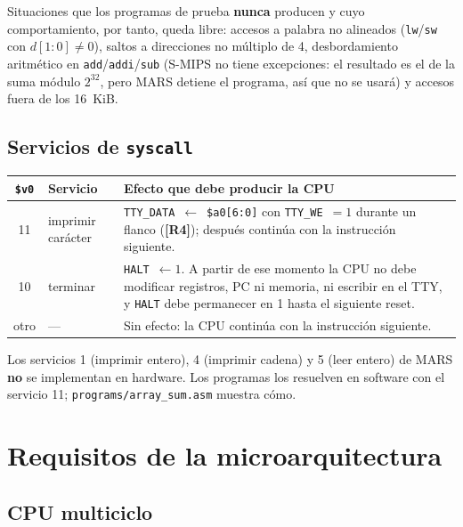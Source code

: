 \documentclass[11pt,a4paper]{article}
\newcommand{\sig}[1]{\texttt{#1}}
\newcommand{\req}[1]{\textbf{[#1]}}
\begin{document}
\noindent Situaciones que los programas de prueba \textbf{nunca} producen y cuyo comportamiento, por tanto, queda libre: accesos a palabra no alineados (\sig{lw}/\sig{sw} con $d[1{:}0]\neq 0$), saltos a direcciones no múltiplo de 4, desbordamiento aritmético en \sig{add}/\sig{addi}/\sig{sub} (S-MIPS no tiene excepciones: el resultado es el de la suma módulo $2^{32}$, pero MARS detiene el programa, así que no se usará) y accesos fuera de los 16~KiB.

\subsection{Servicios de \texttt{syscall}}\label{sec:syscall}

\begin{center}
\begin{tabularx}{\linewidth}{@{}clX@{}}
\toprule
\sig{\$v0} & Servicio & Efecto que debe producir la CPU \\
\midrule
11 & imprimir carácter & \sig{TTY\_DATA}~$\leftarrow$~\sig{\$a0[6:0]} con \sig{TTY\_WE}~$=1$ durante un flanco (\req{R4}); después continúa con la instrucción siguiente. \\
10 & terminar & \sig{HALT}~$\leftarrow 1$. A partir de ese momento la CPU no debe modificar registros, PC ni memoria, ni escribir en el TTY, y \sig{HALT} debe permanecer en 1 hasta el siguiente reset. \\
otro & --- & Sin efecto: la CPU continúa con la instrucción siguiente. \\
\bottomrule
\end{tabularx}
\end{center}

\noindent Los servicios 1 (imprimir entero), 4 (imprimir cadena) y 5 (leer entero) de MARS \textbf{no} se implementan en hardware. Los programas los resuelven en software con el servicio 11; \sig{programs/array\_sum.asm} muestra cómo.

\section{Requisitos de la microarquitectura}

\subsection{CPU multiciclo}
\end{document}
